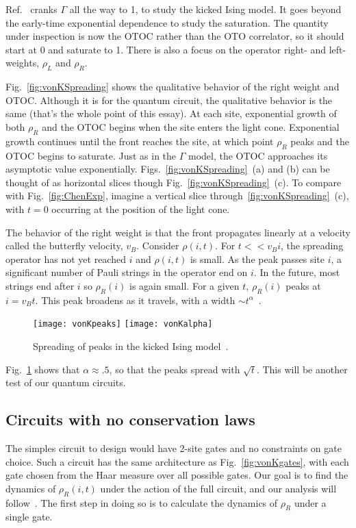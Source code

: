 \documentclass[a4paper,11pt]{article}
\begin{document}
Ref.~\cite{vonKeyserlingkHydro} cranks $\Gamma$ all the way to 1, to study the kicked Ising model. It goes beyond the early-time exponential dependence to study the saturation. The quantity under inspection is now the OTOC rather than the OTO correlator, so it should start at 0 and saturate to 1. There is also a focus on the operator right- and left-weights, $\rho_L$ and $\rho_R$.

Fig.~\ref{fig:vonKSpreading} shows the qualitative behavior of the right weight and OTOC. Although it is for the quantum circuit, the qualitative behavior is the same (that's the whole point of this essay). At each site, exponential growth of both $\rho_R$ and the OTOC begins when the site enters the light cone. Exponential growth continues until the front reaches the site, at which point $\rho_R$ peaks and the OTOC begins to saturate. Just as in the $\Gamma$ model, the OTOC approaches its asymptotic value exponentially. 
Figs.~\ref{fig:vonKSpreading}~(a) and (b) can be thought of as horizontal slices though Fig.~\ref{fig:vonKSpreading}~(c). To compare with Fig.~\ref{fig:ChenExp}, imagine a vertical slice through~\ref{fig:vonKSpreading}~(c), with $t=0$ occurring at the position of the light cone.

The behavior of the right weight is that the front propagates linearly at a velocity called the butterfly velocity, $v_B$. Consider $\rho(i,t)$. For $t<<v_B i$, the spreading operator has not yet reached $i$ and $\rho(i,t)$ is small. As the peak passes site $i$, a significant number of Pauli strings in the operator end on $i$. In the future, most strings end after $i$ so $\rho_R(i)$ is again small. For a given $t$, $\rho_R(i)$ peaks at $i=v_B t$. This peak broadens as it travels, with a width $\sim t^\alpha$~\cite{vonKeyserlingkHydro}.
\begin{figure}
	\centering
	\texttt{[image: vonKpeaks]}
	\texttt{[image: vonKalpha]}
	\caption{Spreading of peaks in the kicked Ising model~\cite{vonKeyserlingkHydro}.}
	\label{fig:vonKalpha}
\end{figure}
Fig.~\ref{fig:vonKalpha} shows that $\alpha\approx .5$, so that the peaks spread with $\sqrt{t}$. This will be another test of our quantum circuits.

\subsection{Circuits with no conservation laws} \label{sub:cncons}

The simples circuit to design would have 2-site gates and no constraints on gate choice. Such a circuit has the same architecture as Fig.~\ref{fig:vonKgates}, with each gate chosen from the Haar measure over all possible gates. Our goal is to find the dynamics of $\rho_R(i,t)$ under the action of the full circuit, and our analysis will follow~\cite{vonKeyserlingkHydro}. The first step in doing so is to calculate the dynamics of $\rho_R$ under a single gate. 
\end{document}
